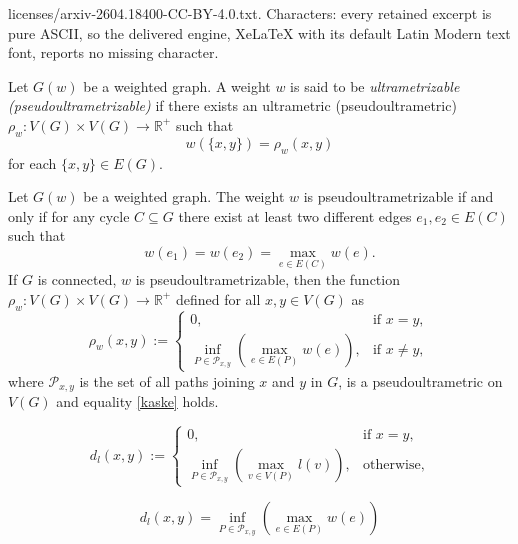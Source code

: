 \documentclass[10pt,a4paper]{amsart}
\begin{document}
licenses/arxiv-2604.18400-CC-BY-4.0.txt. Characters: every retained excerpt is pure ASCII, so the delivered engine, XeLaTeX with its default Latin Modern text font, reports no missing character.
\begin{Definition} Let $G(w)$ be a weighted graph.  A weight $w$ is said to be {\it ultrametrizable (pseudoultrametrizable)} if there exists an ultrametric (pseudoultrametric) $\rho_w : V(G) \times V(G) \to \mathbb{R}^+$ such that 
\begin{equation}
\label{kaske}
    w(\{x,y\})=\rho_w(x,y)
\end{equation}
 for each $\{x,y\} \in E(G)$.
\end{Definition}

\begin{Theorem}\label{kasya} Let $G(w)$ be a  weighted graph. The weight $w$ is pseudoultrametrizable if and only if for any cycle $C \subseteq G$ there exist at least two different edges $e_1, e_2 \in E(C)$ such that
\begin{equation}
    \label{samf}
w(e_1) = w(e_2) = \max_{e \in E(C)} w(e).
\end{equation}
If $G$ is connected, $w$ is  pseudoultrametrizable, then the function $\rho_w : V(G) \times V(G) \to \mathbb{R}^+$ defined for all $x,y \in V(G)$ as 
\begin{equation}
    \label{kjvdde}
\rho_w(x,y) :=
\begin{cases}
0, & \text{if } x = y,\\[6pt]
\inf\limits_{P \in \mathcal{P}_{x,y}} \left( \max\limits_{e \in E(P)} w(e) \right), & \text{if } x \ne y,
\end{cases}
\end{equation}
where $\mathcal{P}_{x,y}$ is the set of all paths joining  $x$ and $y$ in $G$, is a pseudoultrametric on $V(G)$ and equality \eqref{kaske} holds.
\end{Theorem}

\begin{equation}
    \label{fdes1}
d_l(x,y) := 
\begin{cases}
0, & \text{if } x = y,\\
\inf\limits_{P\in \mathcal{P}_{x,y}}\left(\max\limits_{v\in V(P)} l(v)\right), & \text{otherwise},
\end{cases}
\end{equation}

\begin{equation}
    \label{zero}
d_l(x,y)
=
\inf_{P \in \mathcal{P}_{x,y}} \left( \max_{e \in E(P)} w(e) \right)
\end{equation}
\end{document}
